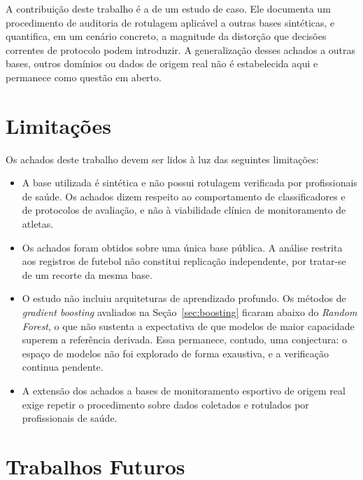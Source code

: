 A contribuição deste trabalho é a de um estudo de caso. Ele documenta um procedimento de auditoria de rotulagem aplicável a outras bases sintéticas, e quantifica, em um cenário concreto, a magnitude da distorção que decisões correntes de protocolo podem introduzir. A generalização desses achados a outras bases, outros domínios ou dados de origem real não é estabelecida aqui e permanece como questão em aberto.

\section{Limitações}

Os achados deste trabalho devem ser lidos à luz das seguintes limitações:
\begin{itemize}
    \item A base utilizada é sintética e não possui rotulagem verificada por profissionais de saúde. Os achados dizem respeito ao comportamento de classificadores e de protocolos de avaliação, e não à viabilidade clínica de monitoramento de atletas.
    \item Os achados foram obtidos sobre uma única base pública. A análise restrita aos registros de futebol não constitui replicação independente, por tratar-se de um recorte da mesma base.
    \item O estudo não incluiu arquiteturas de aprendizado profundo. Os métodos de \textit{gradient boosting} avaliados na Seção~\ref{sec:boosting} ficaram abaixo do \textit{Random Forest}, o que não sustenta a expectativa de que modelos de maior capacidade superem a referência derivada. Essa permanece, contudo, uma conjectura: o espaço de modelos não foi explorado de forma exaustiva, e a verificação continua pendente.
    \item A extensão dos achados a bases de monitoramento esportivo de origem real exige repetir o procedimento sobre dados coletados e rotulados por profissionais de saúde.
\end{itemize}

\section{Trabalhos Futuros}

